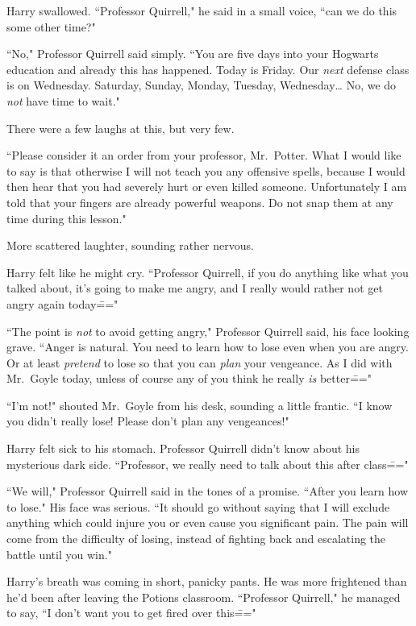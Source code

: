 Harry swallowed. ``Professor Quirrell," he said in a small voice, ``can we do this some other time?"

``No," Professor Quirrell said simply. ``You are five days into your Hogwarts education and already this has happened. Today is Friday. Our \emph{next} defense class is on Wednesday. Saturday, Sunday, Monday, Tuesday, Wednesday{\ldots} No, we do \emph{not} have time to wait."

There were a few laughs at this, but very few.

``Please consider it an order from your professor, Mr.~Potter. What I would like to say is that otherwise I will not teach you any offensive spells, because I would then hear that you had severely hurt or even killed someone. Unfortunately I am told that your fingers are already powerful weapons. Do not snap them at any time during this lesson."

More scattered laughter, sounding rather nervous.

Harry felt like he might cry. ``Professor Quirrell, if you do anything like what you talked about, it's going to make me angry, and I really would rather not get angry again today\==="

``The point is \emph{not} to avoid getting angry," Professor Quirrell said, his face looking grave. ``Anger is natural. You need to learn how to lose even when you are angry. Or at least \emph{pretend} to lose so that you can \emph{plan} your vengeance. As I did with Mr.~Goyle today, unless of course any of you think he really \emph{is} better\==="

``I'm not!" shouted Mr.~Goyle from his desk, sounding a little frantic. ``I know you didn't really lose! Please don't plan any vengeances!"

Harry felt sick to his stomach. Professor Quirrell didn't know about his mysterious dark side. ``Professor, we really need to talk about this after class\==="

``We will," Professor Quirrell said in the tones of a promise. ``After you learn how to lose." His face was serious. ``It should go without saying that I will exclude anything which could injure you or even cause you significant pain. The pain will come from the difficulty of losing, instead of fighting back and escalating the battle until you win."

Harry's breath was coming in short, panicky pants. He was more frightened than he'd been after leaving the Potions classroom. ``Professor Quirrell," he managed to say, ``I don't want you to get fired over this\==="

